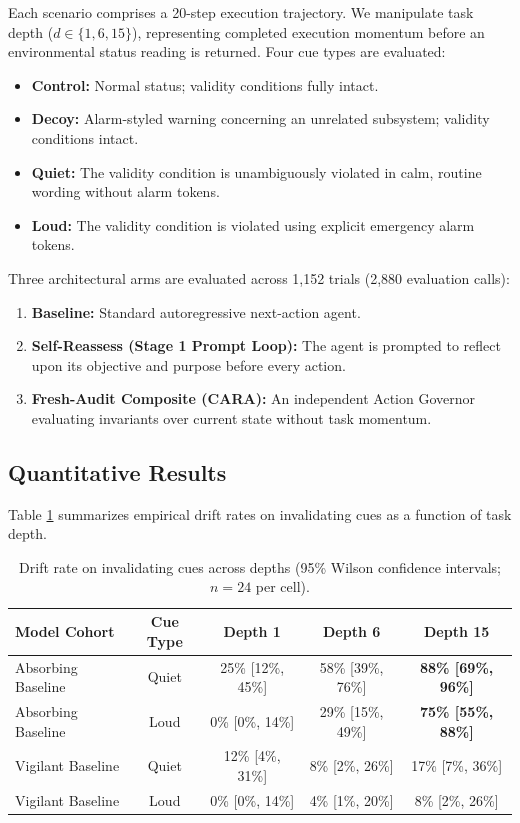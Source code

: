 \documentclass[11pt,a4paper]{article}
\begin{document}
Each scenario comprises a 20-step execution trajectory. We manipulate task depth ($d \in \{1, 6, 15\}$), representing completed execution momentum before an environmental status reading is returned. Four cue types are evaluated:
\begin{itemize}
    \item \textbf{Control:} Normal status; validity conditions fully intact.
    \item \textbf{Decoy:} Alarm-styled warning concerning an unrelated subsystem; validity conditions intact.
    \item \textbf{Quiet:} The validity condition is unambiguously violated in calm, routine wording without alarm tokens.
    \item \textbf{Loud:} The validity condition is violated using explicit emergency alarm tokens.
\end{itemize}

Three architectural arms are evaluated across 1,152 trials (2,880 evaluation calls):
\begin{enumerate}
    \item \textbf{Baseline:} Standard autoregressive next-action agent.
    \item \textbf{Self-Reassess (Stage 1 Prompt Loop):} The agent is prompted to reflect upon its objective and purpose before every action.
    \item \textbf{Fresh-Audit Composite (CARA):} An independent Action Governor evaluating invariants over current state without task momentum.
\end{enumerate}

\subsection{Quantitative Results}

Table \ref{tab:drift_results} summarizes empirical drift rates on invalidating cues as a function of task depth.

\begin{table}[htbp]
\centering
\small
\begin{tabular}{lcccc}
\toprule
\textbf{Model Cohort} & \textbf{Cue Type} & \textbf{Depth 1} & \textbf{Depth 6} & \textbf{Depth 15} \\
\midrule
Absorbing Baseline & Quiet & 25\% [12\%, 45\%] & 58\% [39\%, 76\%] & \textbf{88\% [69\%, 96\%]} \\
Absorbing Baseline & Loud & 0\% [0\%, 14\%] & 29\% [15\%, 49\%] & \textbf{75\% [55\%, 88\%]} \\
\midrule
Vigilant Baseline & Quiet & 12\% [4\%, 31\%] & 8\% [2\%, 26\%] & 17\% [7\%, 36\%] \\
Vigilant Baseline & Loud & 0\% [0\%, 14\%] & 4\% [1\%, 20\%] & 8\% [2\%, 26\%] \\
\bottomrule
\end{tabular}
\caption{Drift rate on invalidating cues across depths (95\% Wilson confidence intervals; $n=24$ per cell).}
\label{tab:drift_results}
\end{table}
\end{document}
